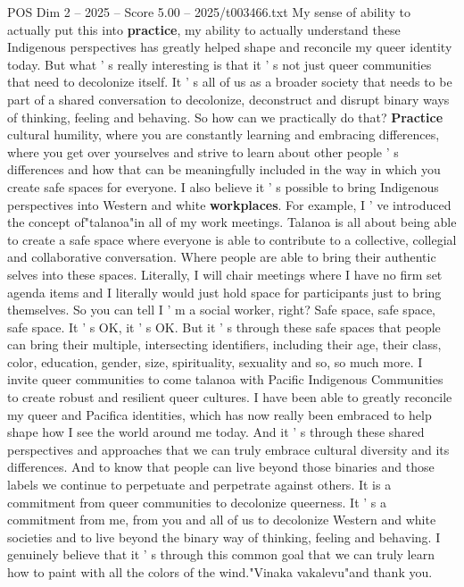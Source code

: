 \begin{textsample}{POS Dim 2 – 2025 – Score 5.00 – 2025/t003466.txt}
My sense of ability to actually put this into \textbf{practice}, my ability to actually understand these Indigenous perspectives has greatly helped shape and reconcile my queer identity today.
But what ' s really interesting is that it ' s not just queer communities that need to decolonize itself.
It ' s all of us as a broader society that needs to be part of a shared conversation to decolonize, deconstruct and disrupt binary ways of thinking, feeling and behaving.
So how can we practically do that? \textbf{Practice} cultural humility, where you are constantly learning and embracing differences, where you get over yourselves and strive to learn about other people ' s differences and how that can be meaningfully included in the way in which you create safe spaces for everyone.
I also believe it ' s possible to bring Indigenous perspectives into Western and white \textbf{workplaces}.
For example, I ' ve introduced the concept of"talanoa"in all of my work meetings.
Talanoa is all about being able to create a safe space where everyone is able to contribute to a collective, collegial and collaborative conversation.
Where people are able to bring their authentic selves into these spaces.
Literally, I will chair meetings where I have no firm set agenda items and I literally would just hold space for participants just to bring themselves.
So you can tell I ' m a social worker, right?
Safe space, safe space, safe space.
It ' s OK, it ' s OK.
But it ' s through these safe spaces that people can bring their multiple, intersecting identifiers, including their age, their class, color, education, gender, size, spirituality, sexuality and so, so much more.
I invite queer communities to come talanoa with Pacific Indigenous Communities to create robust and resilient queer cultures.
I have been able to greatly reconcile my queer and Pacifica identities, which has now really been embraced to help shape how I see the world around me today.
And it ' s through these shared perspectives and approaches that we can truly embrace cultural diversity and its differences.
And to know that people can live beyond those binaries and those labels we continue to perpetuate and perpetrate against others.
It is a commitment from queer communities to decolonize queerness.
It ' s a commitment from me, from you and all of us to decolonize Western and white societies and to live beyond the binary way of thinking, feeling and behaving.
I genuinely believe that it ' s through this common goal that we can truly learn how to paint with all the colors of the wind."Vinaka vakalevu"and thank you.

\end{textsample}
